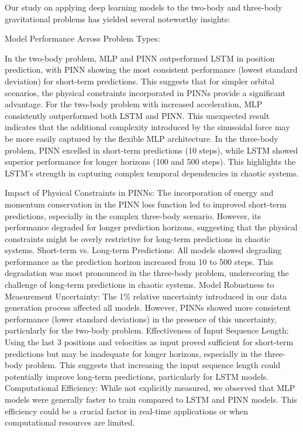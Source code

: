 \documentclass[11pt,a4paper, twocolumn]{article}
\begin{document}
Our study on applying deep learning models to the two-body and three-body gravitational problems has yielded several noteworthy insights:

Model Performance Across Problem Types:

In the two-body problem, MLP and PINN outperformed LSTM in position prediction, with PINN showing the most consistent performance (lowest standard deviation) for short-term predictions. This suggests that for simpler orbital scenarios, the physical constraints incorporated in PINNs provide a significant advantage.
For the two-body problem with increased acceleration, MLP consistently outperformed both LSTM and PINN. This unexpected result indicates that the additional complexity introduced by the sinusoidal force may be more easily captured by the flexible MLP architecture.
In the three-body problem, PINN excelled in short-term predictions (10 steps), while LSTM showed superior performance for longer horizons (100 and 500 steps). This highlights the LSTM's strength in capturing complex temporal dependencies in chaotic systems.

Impact of Physical Constraints in PINNs:
The incorporation of energy and momentum conservation in the PINN loss function led to improved short-term predictions, especially in the complex three-body scenario. However, its performance degraded for longer prediction horizons, suggesting that the physical constraints might be overly restrictive for long-term predictions in chaotic systems.
Short-term vs. Long-term Predictions:
All models showed degrading performance as the prediction horizon increased from 10 to 500 steps. This degradation was most pronounced in the three-body problem, underscoring the challenge of long-term predictions in chaotic systems.
Model Robustness to Measurement Uncertainty:
The 1\% relative uncertainty introduced in our data generation process affected all models. However, PINNs showed more consistent performance (lower standard deviations) in the presence of this uncertainty, particularly for the two-body problem.
Effectiveness of Input Sequence Length:
Using the last 3 positions and velocities as input proved sufficient for short-term predictions but may be inadequate for longer horizons, especially in the three-body problem. This suggests that increasing the input sequence length could potentially improve long-term predictions, particularly for LSTM models.
Computational Efficiency:
While not explicitly measured, we observed that MLP models were generally faster to train compared to LSTM and PINN models. This efficiency could be a crucial factor in real-time applications or when computational resources are limited.
\end{document}
